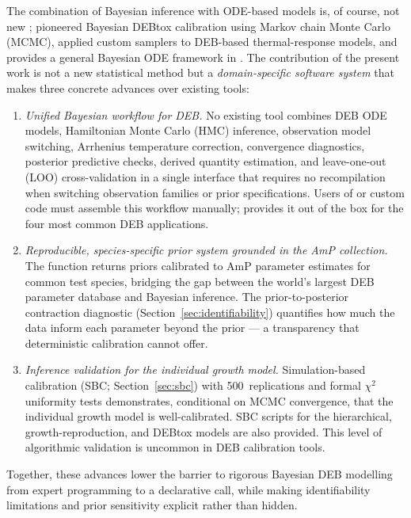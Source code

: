\documentclass[article,shortnames]{jss}
\begin{document}
The combination of Bayesian inference with ODE-based models is, of
course, not new \citep{GelmanBDA2013}; \citet{BilloirBayesDEB2008}
pioneered Bayesian DEBtox calibration using Markov chain Monte Carlo (MCMC),
\citet{JohnsonDEB2015} applied custom samplers to DEB-based
thermal-response models, and 
\citep{deBInfer2017} provides a general Bayesian ODE framework in
.  The contribution of the present work is not a new
statistical method but a \emph{domain-specific software
system} that makes three concrete advances over existing tools:
\begin{enumerate}
  \item \emph{Unified Bayesian workflow for DEB.}  No existing tool
    combines DEB ODE models, Hamiltonian Monte Carlo (HMC) inference, observation model
    switching, Arrhenius temperature correction, convergence
    diagnostics, posterior predictive checks, derived quantity
    estimation, and leave-one-out (LOO) cross-validation in a single
     interface that requires no recompilation when
    switching observation families or prior specifications.  Users of
     or custom  code must assemble
    this workflow manually;  provides it
    out of the box for the four most common DEB applications.
  \item \emph{Reproducible, species-specific prior system grounded
    in the AmP collection.}  The function 
    returns priors calibrated to AmP parameter estimates
    \citep{MarquesAmP2018} for common test species, bridging the
    gap between the world's largest DEB parameter database and
    Bayesian inference.  The prior-to-posterior contraction
    diagnostic (Section~\ref{sec:identifiability}) quantifies
    how much the data inform each parameter beyond the prior ---
    a transparency that deterministic calibration cannot offer.
  \item \emph{Inference validation for the individual growth model.}
    Simulation-based calibration (SBC;
    Section~\ref{sec:sbc}) with 500~replications and formal
    $\chi^2$ uniformity tests demonstrates, conditional on MCMC
    convergence, that the individual growth model is well-calibrated.
    SBC scripts for the hierarchical, growth-reproduction, and
    DEBtox models are also provided.  This level of algorithmic
    validation is uncommon in DEB calibration tools.
\end{enumerate}
Together, these advances lower the barrier to rigorous Bayesian DEB
modelling from expert  programming to a declarative
 call, while making identifiability limitations and
prior sensitivity explicit rather than hidden.
\end{document}
